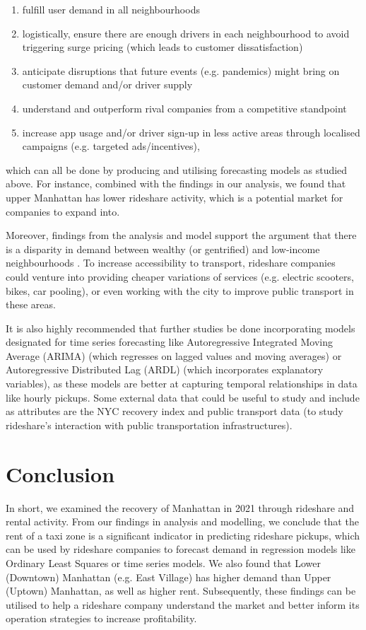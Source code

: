\documentclass[11pt]{article}
\begin{document}
\begin{enumerate}[label=(\roman*)]
\item fulfill user demand in all neighbourhoods
\item logistically, ensure there are enough drivers in each neighbourhood to avoid triggering surge pricing (which leads to customer dissatisfaction)
\item anticipate disruptions that future events (e.g. pandemics) might bring on customer demand and/or driver supply
\item understand and outperform rival companies from a competitive standpoint
\item increase app usage and/or driver sign-up in less active areas through localised campaigns (e.g. targeted ads/incentives),
\end{enumerate}
which can all be done by producing and utilising forecasting models as studied above. For instance, combined with the findings in our analysis, we found that upper Manhattan has lower rideshare activity, which is a potential market for companies to expand into.

Moreover, findings from the analysis and model support the argument that there is a disparity in demand between wealthy (or gentrified) and low-income neighbourhoods \cite{politico}. To increase accessibility to transport, rideshare companies could venture into providing cheaper variations of services (e.g. electric scooters, bikes, car pooling), or even working with the city to improve public transport in these areas.

It is also highly recommended that further studies be done incorporating models designated for time series forecasting like Autoregressive Integrated Moving Average (ARIMA) (which regresses on lagged values and moving averages) or Autoregressive Distributed Lag (ARDL) (which incorporates explanatory variables), as these models are better at capturing temporal relationships in data like hourly pickups. Some external data that could be useful to study and include as attributes are the NYC recovery index \cite{nycindex} and public transport data (to study rideshare's interaction with public transportation infrastructures).

\section{Conclusion}
In short, we examined the recovery of Manhattan in 2021 through rideshare and rental activity. From our findings in analysis and modelling, we conclude that the rent of a taxi zone is a significant indicator in predicting rideshare pickups, which can be used by rideshare companies to forecast demand in regression models like Ordinary Least Squares or time series models. We also found that Lower (Downtown) Manhattan (e.g. East Village) has higher demand than Upper (Uptown) Manhattan, as well as higher rent. Subsequently, these findings can be utilised to help a rideshare company understand the market and better inform its operation strategies to increase profitability.



\clearpage

\printbibliography
\end{document}
